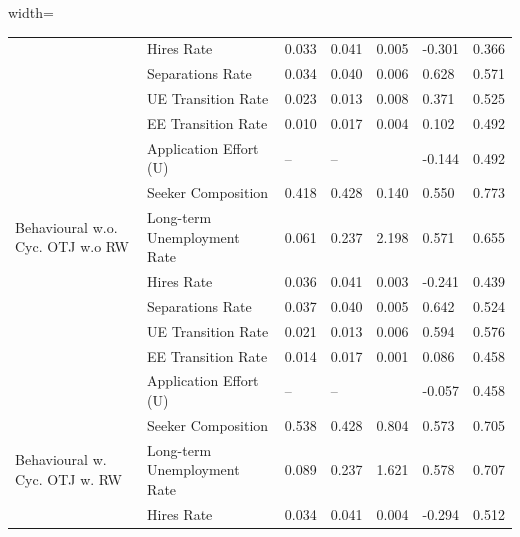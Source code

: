 \begin{adjustbox}{width=\textwidth}
\begin{tabular}{lllllll}
\cellcolor{modelBehaviouralwCycOTJwoRW!25} & Hires Rate & 0.033 & 0.041 & 0.005 & \cellcolor{green!40!yellow!25}-0.301 & 0.366 \\
\cellcolor{modelBehaviouralwCycOTJwoRW!25} & Separations Rate & 0.034 & 0.040 & 0.006 & \cellcolor{green!70!yellow!25}0.628 & 0.571 \\
\cellcolor{modelBehaviouralwCycOTJwoRW!25} & UE Transition Rate & 0.023 & 0.013 & 0.008 & \cellcolor{orange!25}0.371 & 0.525 \\
\cellcolor{modelBehaviouralwCycOTJwoRW!25} & EE Transition Rate & 0.010 & 0.017 & 0.004 & \cellcolor{orange!25}0.102 & 0.492 \\
\cellcolor{modelBehaviouralwCycOTJwoRW!25} & Application Effort (U) & -- & -- &  & \cellcolor{green!70!yellow!25}-0.144 & 0.492 \\
\cellcolor{modelBehaviouralwCycOTJwoRW!25} & Seeker Composition & 0.418 & 0.428 & 0.140 & \cellcolor{orange!25}0.550 & 0.773 \\
\cellcolor{modelBehaviouralwoCycOTJwoRW!25}Behavioural w.o. Cyc. OTJ w.o RW & Long-term Unemployment Rate & 0.061 & 0.237 & 2.198 & \cellcolor{green!40!yellow!25}0.571 & 0.655 \\
\cellcolor{modelBehaviouralwoCycOTJwoRW!25} & Hires Rate & 0.036 & 0.041 & 0.003 & \cellcolor{green!25}-0.241 & 0.439 \\
\cellcolor{modelBehaviouralwoCycOTJwoRW!25} & Separations Rate & 0.037 & 0.040 & 0.005 & \cellcolor{green!25}0.642 & 0.524 \\
\cellcolor{modelBehaviouralwoCycOTJwoRW!25} & UE Transition Rate & 0.021 & 0.013 & 0.006 & \cellcolor{green!25}0.594 & 0.576 \\
\cellcolor{modelBehaviouralwoCycOTJwoRW!25} & EE Transition Rate & 0.014 & 0.017 & 0.001 & \cellcolor{red!25}0.086 & 0.458 \\
\cellcolor{modelBehaviouralwoCycOTJwoRW!25} & Application Effort (U) & -- & -- &  & \cellcolor{green!25}-0.057 & 0.458 \\
\cellcolor{modelBehaviouralwoCycOTJwoRW!25} & Seeker Composition & 0.538 & 0.428 & 0.804 & \cellcolor{yellow!25}0.573 & 0.705 \\
\cellcolor{modelBehaviouralwCycOTJwRW!25}Behavioural w. Cyc. OTJ w. RW & Long-term Unemployment Rate & 0.089 & 0.237 & 1.621 & \cellcolor{green!70!yellow!25}0.578 & 0.707 \\
\cellcolor{modelBehaviouralwCycOTJwRW!25} & Hires Rate & 0.034 & 0.041 & 0.004 & \cellcolor{green!70!yellow!25}-0.294 & 0.512 \\

\end{tabular}
\end{adjustbox}
